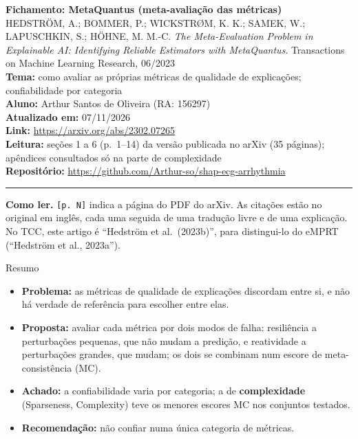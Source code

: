 \documentclass[11pt,a4paper]{article}
\begin{document}
\begin{center}
    {\LARGE \textbf{Fichamento: MetaQuantus (meta-avaliação das métricas)}} \\[0.35em]
    {\large HEDSTRÖM, A.; BOMMER, P.; WICKSTRØM, K. K.; SAMEK, W.; LAPUSCHKIN, S.; HÖHNE, M. M.-C. \textit{The Meta-Evaluation Problem in Explainable AI: Identifying Reliable Estimators with MetaQuantus}. Transactions on Machine Learning Research, 06/2023} \\[0.3em]
    \textbf{Tema:} como avaliar as próprias métricas de qualidade de explicações; confiabilidade por categoria \\[0.2em]
    \textbf{Aluno:} Arthur Santos de Oliveira (RA: 156297) \\[0.2em]
    \textbf{Atualizado em:} 07/11/2026 \\[0.2em]
    \textbf{Link:} \url{https://arxiv.org/abs/2302.07265} \\[0.2em]
    \textbf{Leitura:} seções 1 a 6 (p.~1--14) da versão publicada no arXiv (35 páginas); apêndices consultados só na parte de complexidade \\[0.2em]
    \textbf{Repositório:} \url{https://github.com/Arthur-so/shap-ecg-arrhythmia}
\end{center}
\vspace{-0.5em}
\hrule
\vspace{0.8em}

\textbf{Como ler.} \texttt{[p. N]} indica a página do PDF do arXiv. As citações estão no original em inglês, cada uma seguida de uma tradução livre e de uma explicação. No TCC, este artigo é ``Hedström et al.\ (2023b)'', para distingui-lo do eMPRT (``Hedström et al., 2023a'').

\begin{infobox}[note]{Resumo}
\begin{itemize}
\item \textbf{Problema:} as métricas de qualidade de explicações discordam entre si, e não há verdade de referência para escolher entre elas.
\item \textbf{Proposta:} avaliar cada métrica por dois modos de falha: resiliência a perturbações pequenas, que não mudam a predição, e reatividade a perturbações grandes, que mudam; os dois se combinam num escore de meta-consistência (MC).
\item \textbf{Achado:} a confiabilidade varia por categoria; a de \textbf{complexidade} (Sparseness, Complexity) teve os menores escores MC nos conjuntos testados.
\item \textbf{Recomendação:} não confiar numa única categoria de métricas.
\end{itemize}
\end{infobox}
\end{document}
